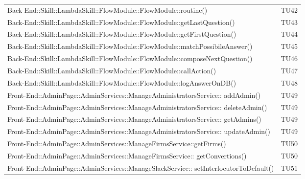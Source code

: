 \documentclass[../PianoDiQualifica_v3.0.0.tex]{subfiles}
\begin{document}
\begin{longtable}[c] {>{\centering\arraybackslash}p{} >{\centering\arraybackslash}p{}}
 			\addlinespace[0.3em]
			\midrule
			\addlinespace[0.3em]
			Back-End::Skill::LambdaSkill::FlowModule::FlowModule::routine() & TU42 \\
			\addlinespace[0.3em]
			\midrule
			\addlinespace[0.3em]
 			Back-End::Skill::LambdaSkill::FlowModule::FlowModule::getLastQuestion() & TU43 \\
 			\addlinespace[0.3em]
			\midrule
			\addlinespace[0.3em]
 			Back-End::Skill::LambdaSkill::FlowModule::FlowModule::getFirstQuestion() & TU44 \\
 			\addlinespace[0.3em]
			\midrule
			\addlinespace[0.3em]
			Back-End::Skill::LambdaSkill::FlowModule::FlowModule::matchPossibileAnswer() & TU45 \\
			\addlinespace[0.3em]
			\midrule
			\addlinespace[0.3em]
			Back-End::Skill::LambdaSkill::FlowModule::FlowModule::composeNextQuestion() & TU46 \\
			\addlinespace[0.3em]
			\midrule
			\addlinespace[0.3em]
 			Back-End::Skill::LambdaSkill::FlowModule::FlowModule::callAction() & TU47 \\
 			\addlinespace[0.3em]
			\midrule
			\addlinespace[0.3em]
 			Back-End::Skill::LambdaSkill::FlowModule::FlowModule::logAnswerOnDB() & TU48 \\
 			\addlinespace[0.3em]
			\midrule
			\addlinespace[0.3em]
 			Front-End::AdminPage::AdminServices::ManageAdministratorsService:: addAdmin() & TU49 \\
 			\addlinespace[0.3em]
			\midrule
			\addlinespace[0.3em]
 			Front-End::AdminPage::AdminServices::ManageAdministratorsService:: deleteAdmin() & TU49 \\
 			\addlinespace[0.3em]
			\midrule
			\addlinespace[0.3em]
 			Front-End::AdminPage::AdminServices::ManageAdministratorsService:: getAdmins() & TU49 \\
 			\addlinespace[0.3em]
			\midrule
			\addlinespace[0.3em]
 			Front-End::AdminPage::AdminServices::ManageAdministratorsService:: updateAdmin() & TU49 \\
 			\addlinespace[0.3em]
			\midrule
			\addlinespace[0.3em]
 			Front-End::AdminPage::AdminServices::ManageFirmsService::getFirms() & TU50 \\
 			\addlinespace[0.3em]
			\midrule
			\addlinespace[0.3em]
 			Front-End::AdminPage::AdminServices::ManageFirmsService:: getConvertions() & TU50 \\
 			\addlinespace[0.3em]
			\midrule
			\addlinespace[0.3em]
 			Front-End::AdminPage::AdminServices::ManageSlackService:: setInterlocutorToDefault() & TU51 \\

\end{longtable}
\end{document}

